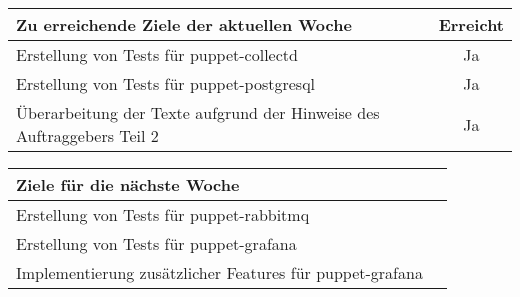 \begin{tabularx}{\textwidth}{Xc}
    \arrayrulecolor{OliveGreen}
    \toprule
    {\bfseries Zu erreichende Ziele der aktuellen Woche} & {\bfseries Erreicht} \\
    \midrule[2pt]
    Erstellung von Tests für puppet-collectd             &Ja                    \\
    \rowcolor{OliveGreen!15}
    Erstellung von Tests für puppet-postgresql           &Ja                    \\
    \rowcolor{White}
    Überarbeitung der Texte aufgrund der Hinweise des Auftraggebers Teil 2 &Ja  \\
    \bottomrule[2pt]
\end{tabularx}
%
\vspace{1cm}
%
\begin{tabularx}{\textwidth}{Xc}
    \arrayrulecolor{OliveGreen}
    \toprule
    {\bfseries Ziele für die nächste Woche}              &                      \\
    \midrule[2pt]
    Erstellung von Tests für puppet-rabbitmq             &                      \\
    \rowcolor{OliveGreen!15}
    Erstellung von Tests für puppet-grafana              &                      \\
    \rowcolor{White}
    Implementierung zusätzlicher Features für puppet-grafana &                  \\
\end{tabularx}
